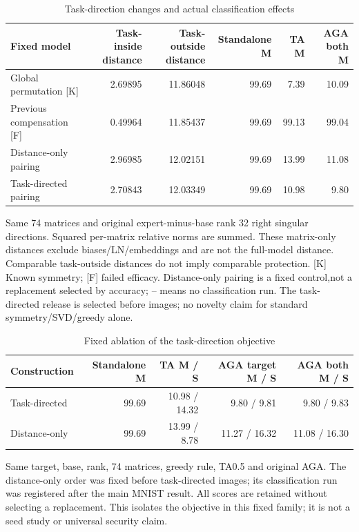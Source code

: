\begin{table}[!htbp]
\centering
\small
\caption{Task-direction changes and actual classification effects}
\label{tab:geometry}
\begin{tabular}{lrrrrr}
\toprule
Fixed model & Task-inside distance & Task-outside distance & Standalone M & TA M & AGA both M \\
\midrule
Global permutation [K] & 2.69895 & 11.86048 & 99.69 & 7.39 & 10.09 \\
Previous compensation [F] & 0.49964 & 11.85437 & 99.69 & 99.13 & 99.04 \\
Distance-only pairing & 2.96985 & 12.02151 & 99.69 & 13.99 & 11.08 \\
Task-directed pairing & 2.70843 & 12.03349 & 99.69 & 10.98 & 9.80 \\
\bottomrule
\end{tabular}
\par\vspace{3pt}\begin{minipage}{0.98\linewidth}\footnotesize Same 74 matrices and original expert-minus-base rank 32 right singular directions. Squared per-matrix relative norms are summed. These matrix-only distances exclude biases/LN/embeddings and are not the full-model distance. Comparable task-outside distances do not imply comparable protection. [K] Known symmetry; [F] failed efficacy. Distance-only pairing is a fixed control,not a replacement selected by accuracy; -- means no classification run. The task-directed release is selected before images; no novelty claim for standard symmetry/SVD/greedy alone.\end{minipage}
\end{table}

\begin{table}[!htbp]
\centering
\small
\caption{Fixed ablation of the task-direction objective}
\label{tab:distance_ablation}
\begin{tabular}{lrrrr}
\toprule
Construction & Standalone M & TA M / S & AGA target M / S & AGA both M / S \\
\midrule
Task-directed & 99.69 & 10.98 / 14.32 & 9.80 / 9.81 & 9.80 / 9.83 \\
Distance-only & 99.69 & 13.99 / 8.78 & 11.27 / 16.32 & 11.08 / 16.30 \\
\bottomrule
\end{tabular}
\par\vspace{3pt}\begin{minipage}{0.98\linewidth}\footnotesize Same target, base, rank, 74 matrices, greedy rule, TA0.5 and original AGA. The distance-only order was fixed before task-directed images; its classification run was registered after the main MNIST result. All scores are retained without selecting a replacement. This isolates the objective in this fixed family; it is not a seed study or universal security claim.\end{minipage}
\end{table}

